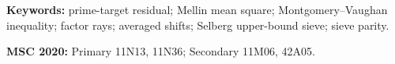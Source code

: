 \documentclass[11pt]{article}
\theoremstyle{definition}
\theoremstyle{remark}
\begin{document}
\noindent\textbf{Keywords:} prime-target residual; Mellin mean square;
Montgomery--Vaughan inequality; factor rays; averaged shifts; Selberg
upper-bound sieve; sieve parity.

\medskip
\noindent\textbf{MSC 2020:} Primary 11N13, 11N36; Secondary 11M06,
42A05.












\end{document}
